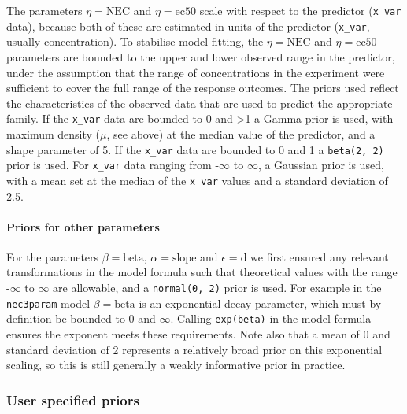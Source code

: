 \documentclass[
]{jss}
\begin{document}
The parameters \(\eta = \text{NEC}\) and \(\eta = \text{ec50}\) scale
with respect to the predictor (\texttt{x\_var} data), because both of
these are estimated in units of the predictor (\texttt{x\_var}, usually
concentration). To stabilise model fitting, the \(\eta = \text{NEC}\)
and \(\eta = \text{ec50}\) parameters are bounded to the upper and lower
observed range in the predictor, under the assumption that the range of
concentrations in the experiment were sufficient to cover the full range
of the response outcomes. The priors used reflect the characteristics of
the observed data that are used to predict the appropriate family. If
the \texttt{x\_var} data are bounded to 0 and \textgreater1 a Gamma
prior is used, with maximum density (\(\mu\), see above) at the median
value of the predictor, and a shape parameter of 5. If the
\texttt{x\_var} data are bounded to 0 and 1 a \texttt{beta(2,\ 2)} prior
is used. For \texttt{x\_var} data ranging from -\(\infty\) to
\(\infty\), a Gaussian prior is used, with a mean set at the median of
the \texttt{x\_var} values and a standard deviation of 2.5.

\hypertarget{priors-for-other-parameters}{%
\paragraph{Priors for other
parameters}\label{priors-for-other-parameters}}

For the parameters \(\beta = \text{beta}\), \(\alpha = \text{slope}\)
and \(\epsilon = \text{d}\) we first ensured any relevant
transformations in the model formula such that theoretical values with
the range -\(\infty\) to \(\infty\) are allowable, and a
\texttt{normal(0,\ 2)} prior is used. For example in the
\texttt{nec3param} model \(\beta = \text{beta}\) is an exponential decay
parameter, which must by definition be bounded to 0 and \(\infty\).
Calling \texttt{exp(beta)} in the model formula ensures the exponent
meets these requirements. Note also that a mean of 0 and standard
deviation of 2 represents a relatively broad prior on this exponential
scaling, so this is still generally a weakly informative prior in
practice.

\hypertarget{user-specified-priors}{%
\subsubsection{User specified priors}\label{user-specified-priors}}
\end{document}
